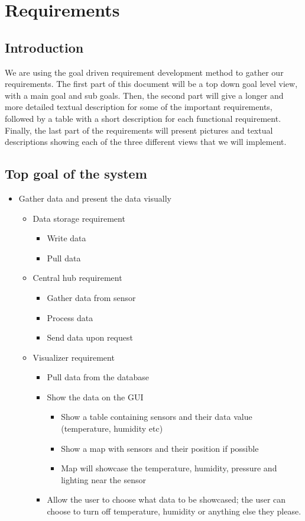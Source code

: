 \documentclass[../document]{subfiles}
\begin{document}
\section{Requirements}
\label{requirements}

\subsection{Introduction}
We are using the goal driven requirement development method to gather our requirements. The first part of this document will be a top down goal level view, with a main goal and sub goals. Then, the second part will give a longer and more detailed textual description for some of the important requirements, followed by a table with a short description for each functional requirement. Finally, the last part of the requirements will present pictures and textual descriptions showing each of the three different views that we will implement.

\subsection{Top goal of the system}
\begin{itemize}
\item
Gather data and present the data visually
\begin{itemize}
\item
Data storage requirement
\begin{itemize}
\item
Write data
\item
Pull data
\end{itemize}
\item
Central hub requirement
\begin{itemize}
\item
Gather data from sensor
\item
Process data
\item
Send data upon request
\end{itemize}
\item
Visualizer requirement
\begin{itemize}
\item
Pull data from the database
\item
Show the data on the GUI
\begin{itemize}
\item
Show a table containing sensors and their data value (temperature, humidity etc)
\item
Show a map with sensors and their position if possible
\item
Map will showcase the temperature, humidity, pressure and lighting near the sensor
\end{itemize}
\item
Allow the user to choose what data to be showcased; the user can choose to turn off temperature, humidity or anything else they please.
\end{itemize}
\end{itemize}
\end{itemize}
\end{document}
